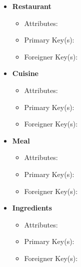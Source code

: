 \documentclass{article}
\begin{document}
\begin{itemize}
        \item \textbf{Restaurant}
        \begin{itemize}
            \item Attributes:
            \item Primary Key(s): 
            \item Foreigner Key(s):
        \end{itemize}

        \item \textbf{Cuisine}
        \begin{itemize}
            \item Attributes:
            \item Primary Key(s): 
            \item Foreigner Key(s):
        \end{itemize}

        \item \textbf{Meal}
        \begin{itemize}
            \item Attributes:
            \item Primary Key(s): 
            \item Foreigner Key(s):
        \end{itemize}

        \item \textbf{Ingredients}
        \begin{itemize}
            \item Attributes:
            \item Primary Key(s): 
            \item Foreigner Key(s):
        \end{itemize}

    \end{itemize}    
    
\end{document}
